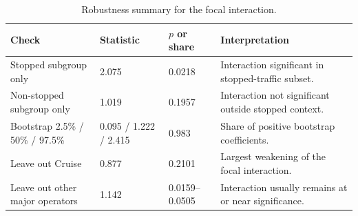 \begin{table}[H]
\centering
\caption{Robustness summary for the focal interaction.}
\label{tab:robustness_results}
\scriptsize
\renewcommand{\arraystretch}{1.08}
\begin{tabular}{p{3.8cm}p{2.5cm}p{2.1cm}p{4.8cm}}
\toprule
Check & Statistic & $p$ or share & Interpretation \\
\midrule
Stopped subgroup only & 2.075 & 0.0218 & Interaction significant in stopped-traffic subset. \\
Non-stopped subgroup only & 1.019 & 0.1957 & Interaction not significant outside stopped context. \\
Bootstrap 2.5\% / 50\% / 97.5\% & 0.095 / 1.222 / 2.415 & 0.983 & Share of positive bootstrap coefficients. \\
Leave out Cruise & 0.877 & 0.2101 & Largest weakening of the focal interaction. \\
Leave out other major operators & 1.142 & 0.0159--0.0505 & Interaction usually remains at or near significance. \\
\bottomrule
\end{tabular}
\end{table}
